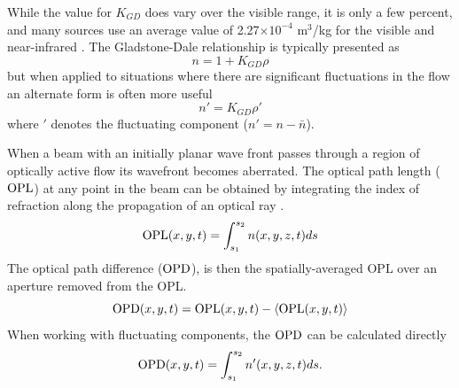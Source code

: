 While the value for $K_{GD}$ does vary over the visible range, it is only a few percent, and many sources use an average value of 2.27$\times10^{-4}$ m$^3$/kg for the visible and near-infrared \cite{Gardiner-1980-reW8xrCb}.
The Gladstone-Dale relationship is typically presented as
\begin{equation}
  n = 1+K_{GD}\rho
  \label{eqn:02_gladstone_dale_relation}
\end{equation}
but when applied to situations where there are significant fluctuations in the flow an alternate form is often more useful
\begin{equation}
  n'=K_{GD}\rho'
  \label{eqn:02_gladstone_dale_relation_fluctuating}
\end{equation}
where $'$ denotes the fluctuating component ($n' = n-\bar{n}$).

When a beam with an initially planar wave front passes through a region of optically active flow its wavefront becomes aberrated.
The optical path length ($\operatorname{OPL}$) at any point in the beam can be obtained by integrating the index of refraction along the propagation of an optical ray \cite{Klein-1986-8Vx29RfE}.
\begin{equation}
  \operatorname{OPL} (x,y,t) = \int^{s_2}_{s_1} n(x,y,z,t)ds
  \label{eqn:02_opl}
\end{equation}
The optical path difference ($\operatorname{OPD}$), is then the spatially-averaged $\textrm{OPL}$ over an aperture removed from the OPL.
\begin{equation}
  \operatorname{OPD}(x,y,t) = \operatorname{OPL}(x,y,t)-\langle\operatorname{OPL}(x,y,t)\rangle
  \label{eqn:02_opd}
\end{equation}
When working with fluctuating components, the $\operatorname{OPD}$ can be calculated directly
\begin{equation}
  \operatorname{OPD}(x,y,t) = \int^{s_2}_{s_1} n'(x,y,z,t)ds \textrm{.}
  \label{eqn:02_opd_n}
\end{equation}

